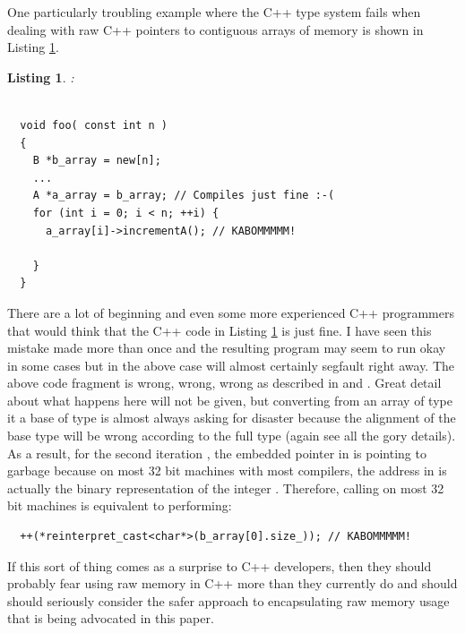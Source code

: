 \documentclass[pdf,ps2pdf,11pt]{SANDreport}
\newtheorem{listing}{Listing}
\begin{document}
One particularly troubling example where the C++ type system fails
when dealing with raw C++ pointers to contiguous arrays of memory is
shown in Listing {}\ref{listing:BadArrayPointerConversion}.

\begin{listing}:\\
\label{listing:BadArrayPointerConversion}
{\small\begin{verbatim}

  void foo( const int n )
  {
    B *b_array = new[n];
    ...
    A *a_array = b_array; // Compiles just fine :-(
    for (int i = 0; i < n; ++i) {
      a_array[i]->incrementA(); // KABOMMMMM!

    }
  }

\end{verbatim}}
\end{listing}

There are a lot of beginning and even some more experienced C++
programmers that would think that the C++ code in Listing
{}\ref{listing:BadArrayPointerConversion} is just fine.  I have seen
this mistake made more than once and the resulting program may seem to
run okay in some cases but in the above case will almost certainly
segfault right away.  The above code fragment is wrong, wrong, wrong
as described in {}\cite[Gotcha \#33]{C++Gotchas03} and {}\cite[Item
\#100]{C++CodingStandards05}.  Great detail about
what happens here will not be given, but converting from an array of
type {} it a base of type {} is almost always asking for
disaster because the alignment of the base type {} will be
wrong according to the full type {} (again see {}\cite[Gotcha
\#33]{C++Gotchas03} all the gory details).  As a result, for the
second iteration {}, the embedded pointer in
{} is pointing to garbage because on
most 32 bit machines with most compilers, the address in
{} is actually the binary
representation of the integer {}.
Therefore, calling {} on most 32 bit
machines is equivalent to performing:

{\small\begin{verbatim}
  ++(*reinterpret_cast<char*>(b_array[0].size_)); // KABOMMMMM!
\end{verbatim}}

If this sort of thing comes as a surprise to C++ developers, then they
should probably fear using raw memory in C++ more than they currently
do and should should seriously consider the safer approach to
encapsulating raw memory usage that is being advocated in this paper.
\end{document}
